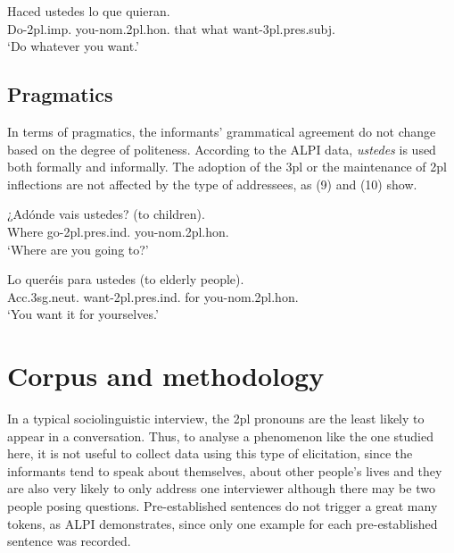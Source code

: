 \documentclass[output=paper]{LSP/langsci}
\begin{document}
\ea
\gll Haced           ustedes                  lo que      quieran.\\ 
Do-2pl.imp. you-nom.2pl.hon. that what want-3pl.pres.subj.\\
\glt   ‘Do whatever you want.’\\
\z

\subsection{Pragmatics}
In terms of pragmatics, the informants’ grammatical agreement do not change based on the degree of politeness. According to the ALPI data, \textit{ustedes} is used both formally and informally. The adoption of the 3pl or the maintenance of 2pl inflections are not affected by the type of addressees, as (9) and (10) show.

\ea
\gll ¿Adónde vais                      ustedes? (to children).\\
Where     go-2pl.pres.ind. you-nom.2pl.hon.\\
\glt   ‘Where are you going to?’\\
\z

\ea
\gll Lo                     queréis                      para ustedes (to elderly people).\\
Acc.3sg.neut. want-2pl.pres.ind. for    you-nom.2pl.hon.\\
\glt   ‘You want it for yourselves.’\\
\z

\section{Corpus and methodology}
In a typical sociolinguistic interview, the 2pl pronouns are the least likely to appear in a conversation. Thus, to analyse a phenomenon like the one studied here, it is not useful to collect data using this type of elicitation, since the informants tend to speak about themselves, about other people’s lives and they are also very likely to only address one interviewer although there may be two people posing questions. Pre-established sentences do not trigger a great many tokens, as ALPI demonstrates, since only one example for each pre-established sentence was recorded.
\end{document}
